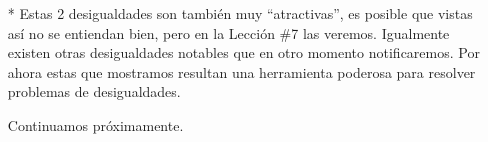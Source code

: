 \begin{itemize}
    \item[*] Estas 2 desigualdades son también muy ``atractivas'', es posible que vistas así no se entiendan bien, pero en la Lección \#7 las veremos. Igualmente existen otras desigualdades notables que en otro momento notificaremos. Por ahora estas que mostramos resultan una herramienta poderosa para resolver problemas de desigualdades.
    
    \item[] Continuamos próximamente.
\end{itemize}

\vspace{0.5cm}